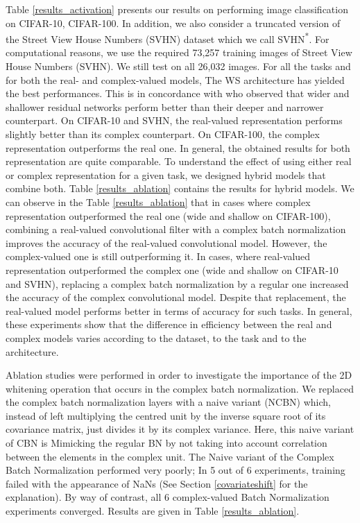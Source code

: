 \documentclass{article}
\begin{document}
Table \ref{results_activation} presents our results on performing image classification on CIFAR-10, CIFAR-100. In addition, we also consider a truncated version of the Street View House Numbers (SVHN) dataset which we call SVHN\textsuperscript{*}. For computational reasons, we use the required 73,257 training images of Street View House Numbers (SVHN). We still test on all 26,032 images. For all the tasks and for both the real- and complex-valued models, The WS architecture has yielded the best performances. This is in concordance with \cite{zagoruyko2016wide} who observed that wider and shallower residual networks perform better than their deeper and narrower counterpart. On CIFAR-10 and SVHN, the real-valued representation performs slightly better than its complex counterpart. On CIFAR-100, the complex representation outperforms the real one. In general, the obtained results for both representation are quite comparable. To understand the effect of using either real or complex representation for a given task, we designed hybrid models that combine both. Table \ref{results_ablation} contains the results for hybrid models. We can observe in the Table \ref{results_ablation} that in cases where complex representation outperformed the real one (wide and shallow on CIFAR-100), combining a real-valued convolutional filter with a complex batch normalization improves the accuracy of the real-valued convolutional model. However, the complex-valued one is still outperforming it. In cases, where real-valued representation outperformed the complex one (wide and shallow on CIFAR-10 and SVHN), replacing a complex batch normalization by a regular one increased the accuracy of the complex convolutional model. Despite that replacement, the real-valued model performs better in terms of accuracy for such tasks. In general, these experiments show that the difference in efficiency between the real and complex models varies according to the dataset, to the task and to the architecture.

Ablation studies were performed in order to investigate the importance of the 2D whitening operation that occurs in the complex batch normalization. We replaced the complex batch normalization layers with a naive variant (NCBN) which, instead of left multiplying the centred unit by the inverse square root of its covariance matrix, just divides it by its complex variance. Here, this naive variant of CBN is Mimicking the regular BN by not taking into account correlation between the elements in the complex unit. The Naive variant of the Complex Batch Normalization performed very poorly; In 5 out of 6 experiments, training failed with the appearance of NaNs (See Section \ref{covariateshift} for the explanation). By way of contrast, all 6 complex-valued Batch Normalization experiments converged. Results are given in Table \ref{results_ablation}.
\end{document}
